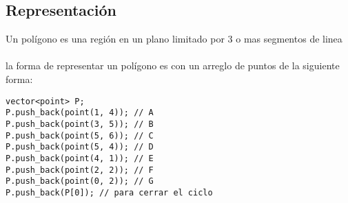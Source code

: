 \subsection{Representación}
Un  polígono es una región en un plano  limitado por 3 o mas segmentos de linea
\\
\\la forma de representar un polígono es con un arreglo de puntos de la siguiente forma:
\begin{lstlisting}[style=C]
vector<point> P;
P.push_back(point(1, 4)); // A
P.push_back(point(3, 5)); // B
P.push_back(point(5, 6)); // C
P.push_back(point(5, 4)); // D
P.push_back(point(4, 1)); // E
P.push_back(point(2, 2)); // F
P.push_back(point(0, 2)); // G
P.push_back(P[0]); // para cerrar el ciclo
\end{lstlisting}
